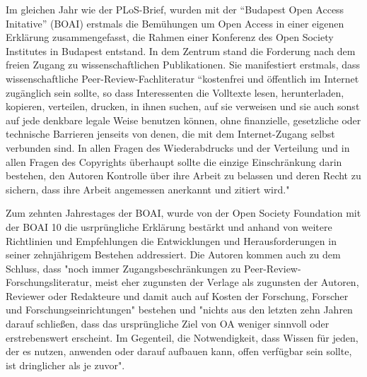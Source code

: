 Im gleichen Jahr wie der PLoS-Brief, wurden mit der “Budapest Open Access Initative” (BOAI)\cite{boai_2012} erstmals die Bemühungen um Open Access in einer eigenen Erklärung zusammengefasst\cite{cite:21a}, die Rahmen einer Konferenz des Open Society Institutes in Budapest entstand. In dem Zentrum stand die Forderung nach dem freien Zugang zu wissenschaftlichen Publikationen. Sie manifestiert erstmals, dass wissenschaftliche Peer-Review-Fachliteratur “kostenfrei und öffentlich im Internet zugänglich sein sollte, so dass Interessenten die Volltexte lesen, herunterladen, kopieren, verteilen, drucken, in ihnen suchen, auf sie verweisen und sie auch sonst auf jede denkbare legale Weise benutzen können, ohne finanzielle, gesetzliche oder technische Barrieren jenseits von denen, die mit dem Internet-Zugang selbst verbunden sind. In allen Fragen des Wiederabdrucks und der Verteilung und in allen Fragen des Copyrights überhaupt sollte die einzige Einschränkung darin bestehen, den Autoren Kontrolle über ihre Arbeit zu belassen und deren Recht zu sichern, dass ihre Arbeit angemessen anerkannt und zitiert wird."\cite{boai_2012} 

Zum zehnten Jahrestages der BOAI, wurde von der Open Society Foundation mit der BOAI 10 die usrprüngliche Erklärung bestärkt und anhand von weitere Richtlinien und Empfehlungen die Entwicklungen und Herausforderungen in seiner zehnjährigem Bestehen addressiert. Die Autoren kommen auch zu dem Schluss, dass  "noch immer Zugangsbeschränkungen zu Peer-Review-Forschungsliteratur, meist eher zugunsten der Verlage als zugunsten der Autoren, Reviewer oder Redakteure und damit auch auf Kosten der Forschung, Forscher und Forschungseinrichtungen" bestehen und "nichts aus den letzten zehn Jahren darauf schließen, dass das ursprüngliche Ziel von OA weniger sinnvoll oder erstrebenswert erscheint. Im Gegenteil, die Notwendigkeit, dass Wissen für jeden, der es nutzen, anwenden oder darauf aufbauen kann, offen verfügbar sein sollte, ist dringlicher als je zuvor".\cite{boai_2012}

